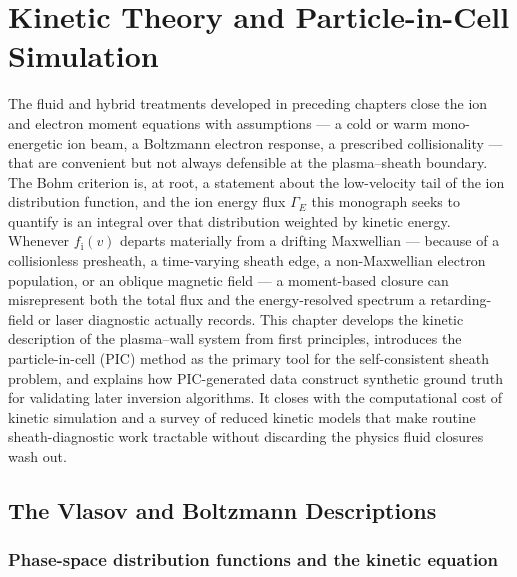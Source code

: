 \chapter{Kinetic Theory and Particle-in-Cell Simulation}
\label{ch:pic}

The fluid and hybrid treatments developed in preceding chapters close the ion and electron moment equations with assumptions --- a cold or warm mono-energetic ion beam, a Boltzmann electron response, a prescribed collisionality --- that are convenient but not always defensible at the plasma--sheath boundary. The Bohm criterion is, at root, a statement about the low-velocity tail of the ion distribution function, and the ion energy flux $\Gamma_{E}$ this monograph seeks to quantify is an integral over that distribution weighted by kinetic energy. Whenever $f_{\mathrm{i}}(v)$ departs materially from a drifting Maxwellian --- because of a collisionless presheath, a time-varying sheath edge, a non-Maxwellian electron population, or an oblique magnetic field --- a moment-based closure can misrepresent both the total flux and the energy-resolved spectrum a retarding-field or laser diagnostic actually records. This chapter develops the kinetic description of the plasma--wall system from first principles, introduces the particle-in-cell (PIC) method as the primary tool for the self-consistent sheath problem, and explains how PIC-generated data construct synthetic ground truth for validating later inversion algorithms. It closes with the computational cost of kinetic simulation and a survey of reduced kinetic models that make routine sheath-diagnostic work tractable without discarding the physics fluid closures wash out.

\section{The Vlasov and Boltzmann Descriptions}

\subsection{Phase-space distribution functions and the kinetic equation}

